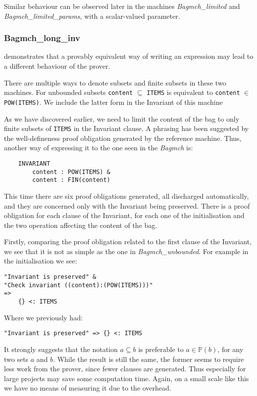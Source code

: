 \documentclass[11pt,journal]{IEEEtran}
\begin{document}
	Similar behaviour can be observed later in the machines \emph{Bagmch\_limited} and \emph{Bagmch\_limited\_params}, with a scalar-valued parameter.
	
	
	\subsubsection{Bagmch\_long\_inv} demonstrates that a provably equivalent way of writing an expression may lead to a different behaviour of the prover. 
	
	There are multiple ways to denote subsets and finite subsets in these two machines. For unbounded subsets \texttt{content} $\subseteq$ \texttt{ITEMS} is equivalent to \texttt{content} $\in$ \texttt{POW(ITEMS)}. We include the latter form in the Invariant of this machine
	
	As we have discovered earlier, we need to limit the content of the bag to only finite subsets of \texttt{ITEMS} in the Invariant clause. A phrasing has been suggested by the well-defineness proof obligation generated by the reference machine. Thus, another way of expressing it to the one seen in the \emph{Bagmch} is:
	
	\begin{lstlisting}
	INVARIANT
	    content : POW(ITEMS) & 
		content : FIN(content) 
	\end{lstlisting}
	
	This time there are six proof obligations generated, all discharged automatically, and they are concerned only with the Invariant being preserved. There is a proof obligation for each clause of the Invariant, for each one of the initialisation and the two operation affecting the content of the bag. 
	
	Firstly, comparing the proof obligation related to the first clause of the Invariant, we see that it is not as simple as the one in \emph{Bagmch\_unbounded}. For example in the initialisation we see:
	
	\begin{lstlisting}
"Invariant is preserved" &
"Check invariant ((content):(POW(ITEMS)))" 
=>
	{} <: ITEMS 
	\end{lstlisting}

	Where we previously had:
	\begin{lstlisting}
"Invariant is preserved" => {} <: ITEMS 
	\end{lstlisting}
	
	It strongly suggests that the notation $a \subseteq b$ is preferable to $a \in \mathbb{P}(b)$, for any two sets $a$ and $b$. While the result is still the same, the former seems to require less work from the prover, since fewer clauses are generated. Thus especially for large projects may save some computation time. Again, on a small scale like this we have no means of measuring it due to the overhead.
	
\end{document}
